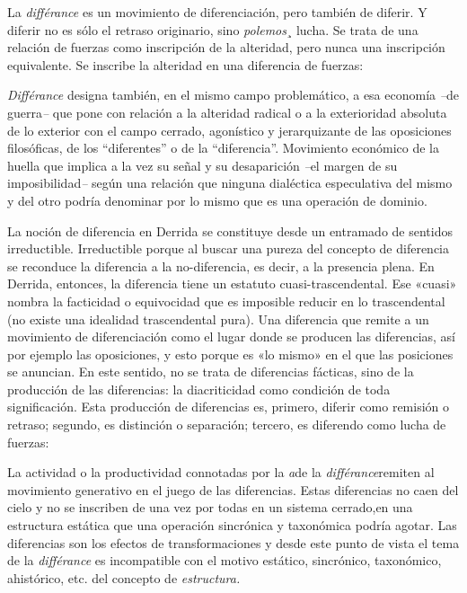 La \emph{différance} es un movimiento de diferenciación, pero también de diferir. Y diferir no es sólo el retraso originario, sino \emph{polemos}¸ lucha. Se trata de una relación de fuerzas como inscripción de la alteridad, pero nunca una inscripción equivalente. Se inscribe la alteridad en una diferencia de fuerzas:

\emph{Différance} designa también, en el mismo campo problemático, a esa economía \emph{--}de guerra\emph{--} que pone con relación a la alteridad radical o a la exterioridad absoluta de lo exterior con el campo cerrado, agonístico y jerarquizante de las oposiciones filosóficas, de los ``diferentes'' o de la ``diferencia''. Movimiento económico de la huella que implica a la vez su señal y su desaparición \emph{--}el margen de su imposibilidad\emph{--} según una relación que ninguna dialéctica especulativa del mismo y del otro podría denominar por lo mismo que es una operación de dominio.

La noción de diferencia en Derrida se constituye desde un entramado de sentidos irreductible. Irreductible porque al buscar una pureza del concepto de diferencia se reconduce la diferencia a la no-diferencia, es decir, a la presencia plena. En Derrida, entonces, la diferencia tiene un estatuto cuasi-trascendental. Ese «cuasi» nombra la facticidad o equivocidad que es imposible reducir en lo trascendental (no existe una idealidad trascendental pura). Una diferencia que remite a un movimiento de diferenciación como el lugar donde se producen las diferencias, así por ejemplo las oposiciones, y esto porque es «lo mismo» en el que las posiciones se anuncian. En este sentido, no se trata de diferencias fácticas, sino de la producción de las diferencias: la diacriticidad como condición de toda significación. Esta producción de diferencias es, primero, diferir como remisión o retraso; segundo, es distinción o separación; tercero, es diferendo como lucha de fuerzas:

La actividad o la productividad connotadas por la \emph{a}de la \emph{différance}remiten al movimiento generativo en el juego de las diferencias. Estas diferencias no caen del cielo y no se inscriben de una vez por todas en un sistema cerrado,en una estructura estática que una operación sincrónica y taxonómica podría agotar. Las diferencias son los efectos de transformaciones y desde este punto de vista el tema de la \emph{différance} es incompatible con el motivo estático, sincrónico, taxonómico, ahistórico, etc. del concepto de \emph{estructura.}

